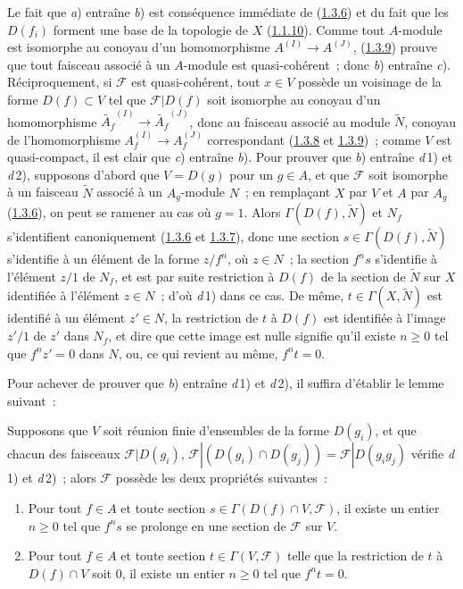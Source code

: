Le fait que \textit{a}) entraîne \textit{b}) est conséquence immédiate de
(\hyperref[I.1.3.6-fr]{1.3.6}) et du fait que les $D(f_i)$ forment une base
de la topologie de $X$ (\hyperref[I.1.1.10-fr]{1.1.10}). Comme tout
$A$-module est isomorphe au conoyau d'un homomorphisme
$A^{(I)}\to A^{(J)}$, (\hyperref[I.1.3.9-fr]{1.3.9}) prouve que tout faisceau
associé à un $A$-module est quasi-cohérent~; donc \textit{b}) entraîne \textit{c}).
Réciproquement, si $\mathscr{F}$ est quasi-cohérent, tout $x\in V$ possède
un voisinage de la forme $D(f)\subset V$ tel que $\mathscr{F}|D(f)$ soit
isomorphe au conoyau d'un homomorphisme
$\widetilde{A_f}^{(I)}\to\widetilde{A_f}^{(J)}$, donc au faisceau associé au
module $\widetilde{N}$, conoyau de l'homomorphisme
$A_f^{(I)}\to A_f^{(J)}$ correspondant
(\hyperref[I.1.3.8-fr]{1.3.8} et \hyperref[I.1.3.9-fr]{1.3.9})~; comme $V$
est quasi-compact, il est clair que \textit{c}) entraîne \textit{b}).
Pour prouver que \textit{b}) entraîne \textit{d}\,1) et \textit{d}\,2),
supposons d'abord que $V=D(g)$ pour un $g\in A$, et que $\mathscr{F}$ soit
isomorphe à un faisceau $\widetilde{N}$ associé à un $A_g$-module $N$~; en
remplaçant $X$ par $V$ et $A$ par $A_g$
(\hyperref[I.1.3.6-fr]{1.3.6}), on peut se ramener au cas où $g=1$. Alors
$\Gamma(D(f),\widetilde{N})$ et $N_f$ s'identifient canoniquement
(\hyperref[I.1.3.6-fr]{1.3.6} et \hyperref[I.1.3.7-fr]{1.3.7}), donc une
section $s\in\Gamma(D(f),\widetilde{N})$ s'identifie à un élément de la
forme $z/f^n$, où $z\in N$~; la section $f^n s$ s'identifie à l'élément
$z/1$ de $N_f$, et est par suite restriction à $D(f)$ de la section de
$\widetilde{N}$ sur $X$ identifiée à l'élément $z\in N$~; d'où
\textit{d}\,1) dans ce cas. De même, $t\in\Gamma(X,\widetilde{N})$ est
identifié à un élément $z'\in N$, la restriction de $t$ à $D(f)$ est
identifiée à l'image $z'/1$ de $z'$ dans $N_f$, et dire que cette image est
nulle signifie qu'il existe $n\geq0$ tel que $f^n z'=0$ dans $N$, ou, ce
qui revient au même, $f^n t=0$.

Pour achever de prouver que \textit{b}) entraîne \textit{d}\,1) et
\textit{d}\,2), il suffira d'établir le lemme suivant~:

\begin{lemma}[1.4.1.1]
\label{I.1.4.1.1-fr}
Supposons que $V$ soit réunion finie d'ensembles de la forme $D(g_i)$, et
que chacun des faisceaux $\mathscr{F}|D(g_i)$,
$\mathscr{F}|(D(g_i)\cap D(g_j))=\mathscr{F}|D(g_i g_j)$ vérifie
\textit{d}\,1) et \textit{d}\,2)~; alors $\mathscr{F}$ possède les deux
propriétés suivantes~:
\begin{enumerate}
  \item[\textit{d}'\,1)] Pour tout $f\in A$ et toute section
  $s\in\Gamma(D(f)\cap V,\mathscr{F})$, il existe un entier $n\geq0$ tel
  que $f^n s$ se prolonge en une section de $\mathscr{F}$ sur $V$.
  \item[\textit{d}'\,2)] Pour tout $f\in A$ et toute section
  $t\in\Gamma(V,\mathscr{F})$ telle que la restriction de $t$ à
  $D(f)\cap V$ soit $0$, il existe un entier $n\geq0$ tel que $f^n t=0$.
\end{enumerate}
\end{lemma}


